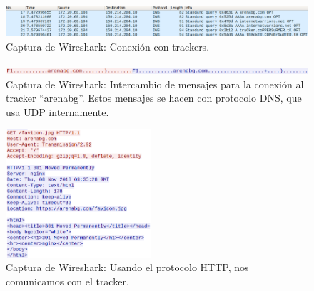 \documentclass{article}
\begin{document}
\begin{figure}[H]
  \centering
  \includegraphics[width=150mm]{imagenes/trackers}
  \caption{Captura de Wireshark: Conexión con trackers.}
\end{figure}

\begin{figure}[H]
  \centering
  \includegraphics[width=150mm]{imagenes/arenabg}
  \caption{Captura de Wireshark: Intercambio de mensajes para la conexión al tracker ``arenabg''. Estos mensajes se hacen con protocolo DNS, que usa UDP internamente.}
\end{figure}

\begin{figure}[H]
  \centering
  \includegraphics[width=54mm]{imagenes/tcp-http-arenabg}
  \caption{Captura de Wireshark: Usando el protocolo HTTP, nos comunicamos con el tracker.}
\end{figure}
\end{document}
